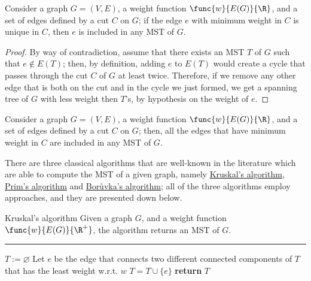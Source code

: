 \documentclass[a4paper, 12pt]{report}
\begin{document}
    \begin{framedlem}{}
        Consider a graph $G = (V, E)$, a weight function $\func{w}{E(G)}{\R}$, and a set of edges defined by a cut $C$ on $G$; if the edge $e$ with minimum weight in $C$ is unique in $C$, then $e$ is included in any MST of $G$.
    \end{framedlem}

    \begin{proof}
        By way of contradiction, assume that there exists an MST $T$ of $G$ such that $e \notin E(T)$; then, by definition, adding $e$ to $E(T)$ would create a cycle that passes through the cut $C$ of $G$ at least twice. Therefore, if we remove any other edge that is both on the cut and in the cycle we just formed, we get a spanning tree of $G$ with less weight then $T$'s, by hypothesis on the weight of $e$.
    \end{proof}

    \begin{framedcor}[label={prim cor}]{}
        Consider a graph $G = (V, E)$, a weight function $\func{w}{E(G)}{\R}$, and a set of edges defined by a cut $C$ on $G$; then, all the edges that have minimum weight in $C$ are included in any MST of $G$.
    \end{framedcor}

    There are three classical algorithms that are well-known in the literature which are able to compute the MST of a given graph, namely \href{https://en.wikipedia.org/wiki/Kruskal%27s_algorithm}{Kruskal's algorithm}, \href{https://en.wikipedia.org/wiki/Prim%27s_algorithm}{Prim's algorithm} and \href{https://en.wikipedia.org/wiki/Bor%C5%AFvka%27s_algorithm}{Borůvka's algorithm}; all of the three algorithms employ \tbf{greedy} approaches, and they are presented down below.

    \begin{framedalgo}{Kruskal's algorithm}
        Given a graph $G$, and a weight function $\func{w}{E(G)}{\R^+}$, the algorithm returns an MST of $G$. \\
        \hrule

        \quad
        \begin{algorithmic}[1]
                \State $T := \varnothing$
                    \State Let $e$ be the edge that connects two different connected components of $T$ that has the least weight w.r.t. $w$
                    \State $T = T \cup \{e\}$
                \EndWhile
                \State \textbf{return} $T$
            \EndFunction
        \end{algorithmic}
    \end{framedalgo}
\end{document}
